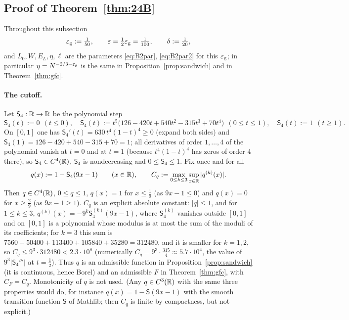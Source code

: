 \subsection{Proof of Theorem~\ref{thm:24B}}\label{sec:proof24}
Throughout this subsection
\[
\varepsilon_{\mathrm g}:=\tfrac1{50},\qquad\varepsilon=\tfrac12\varepsilon_{\mathrm g}=\tfrac1{100},\qquad\delta:=\tfrac1{20},
\]
and $L_0,W,E_L,\eta,\ell$ are the parameters \eqref{eq:B2par}, \eqref{eq:B2par2} for this $\varepsilon_{\mathrm g}$; in particular $\eta=N^{-2/3-\varepsilon_{\mathrm g}}$ is the same in
Proposition~\ref{prop:sandwich} and in Theorem~\ref{thm:gfc}.

\paragraph{The cutoff.} Let $\mathsf S_4:\mathbb{R}\to\mathbb{R}$ be the polynomial step
\[
\mathsf S_4(t):=0\ \ (t\le0),\quad\mathsf S_4(t):=t^5\big(126-420t+540t^2-315t^3+70t^4\big)\ \ (0\le t\le1),\quad\mathsf S_4(t):=1\ \ (t\ge1).
\]
On $[0,1]$ one has $\mathsf S_4'(t)=630\,t^4(1-t)^4\ge0$ (expand both sides) and $\mathsf S_4(1)=126-420+540-315+70=1$; all derivatives of order $1,\dots,4$ of the polynomial vanish at $t=0$ and at $t=1$
(because $t^4(1-t)^4$ has zeros of order $4$ there), so $\mathsf S_4\in C^4(\mathbb{R})$, $\mathsf S_4$ is nondecreasing and $0\le\mathsf S_4\le1$. Fix once and for all
\[
q(x):=1-\mathsf S_4(9x-1)\qquad(x\in\mathbb{R}),\qquad C_q:=\max_{0\le k\le3}\sup_{x\in\mathbb{R}}|q^{(k)}(x)|.
\]
Then $q\in C^4(\mathbb{R})$, $0\le q\le1$, $q(x)=1$ for $x\le\frac19$ (as $9x-1\le0$) and $q(x)=0$ for $x\ge\frac29$ (as $9x-1\ge1$). $C_q$ is an explicit absolute constant:
$|q|\le1$, and for $1\le k\le3$, $q^{(k)}(x)=-9^k\mathsf S_4^{(k)}(9x-1)$, where $\mathsf S_4^{(k)}$ vanishes outside $[0,1]$ and on $[0,1]$ is a polynomial whose modulus is at most the sum of the moduli of its coefficients;
for $k=3$ this sum is $7560+50400+113400+105840+35280=312480$, and it is smaller for $k=1,2$, so $C_q\le9^3\cdot312480<2.3\cdot10^8$ (numerically $C_q=9^3\cdot\frac{315}4\approx5.7\cdot10^4$, the value of $9^3|\mathsf S_4'''|$ at $t=\frac12$).
Thus $q$ is an admissible function in
Proposition~\ref{prop:sandwich} (it is continuous, hence Borel) and an admissible $F$ in Theorem~\ref{thm:gfc}, with $C_F=C_q$. Monotonicity of $q$ is not used.
(Any $q\in C^3(\mathbb{R})$ with the same three properties would do, for instance $q(x)=1-\mathsf S(9x-1)$ with the smooth transition function $\mathsf S$ of Mathlib; then $C_q$ is finite by compactness, but not explicit.)

